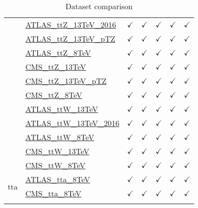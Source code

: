 \documentclass{article}
\begin{document}
\begin{longtable}{|c|l|c|c|c|c|c|}
 & \href{https://arxiv.org}{ATLAS_ttZ_13TeV_2016}  & $\checkmark$ & $\checkmark$ & $\checkmark$ & $\checkmark$ & $\checkmark$\\ \cline{2-7}
 & \href{https://arxiv.org}{ATLAS_ttZ_13TeV_pTZ}  & $\checkmark$ & $\checkmark$ & $\checkmark$ & $\checkmark$ & $\checkmark$\\ \cline{2-7}
 & \href{https://arxiv.org}{ATLAS_ttZ_8TeV}  & $\checkmark$ & $\checkmark$ & $\checkmark$ & $\checkmark$ & $\checkmark$\\ \cline{2-7}
 & \href{https://arxiv.org}{CMS_ttZ_13TeV}  & $\checkmark$ & $\checkmark$ & $\checkmark$ & $\checkmark$ & $\checkmark$\\ \cline{2-7}
 & \href{https://arxiv.org}{CMS_ttZ_13TeV_pTZ}  & $\checkmark$ & $\checkmark$ & $\checkmark$ & $\checkmark$ & $\checkmark$\\ \cline{2-7}
 & \href{https://arxiv.org}{CMS_ttZ_8TeV}  & $\checkmark$ & $\checkmark$ & $\checkmark$ & $\checkmark$ & $\checkmark$\\ \cline{2-7}
 & \href{https://arxiv.org}{ATLAS_ttW_13TeV}  & $\checkmark$ & $\checkmark$ & $\checkmark$ & $\checkmark$ & $\checkmark$\\ \cline{2-7}
 & \href{https://arxiv.org}{ATLAS_ttW_13TeV_2016}  & $\checkmark$ & $\checkmark$ & $\checkmark$ & $\checkmark$ & $\checkmark$\\ \cline{2-7}
 & \href{https://arxiv.org}{ATLAS_ttW_8TeV}  & $\checkmark$ & $\checkmark$ & $\checkmark$ & $\checkmark$ & $\checkmark$\\ \cline{2-7}
 & \href{https://arxiv.org}{CMS_ttW_13TeV}  & $\checkmark$ & $\checkmark$ & $\checkmark$ & $\checkmark$ & $\checkmark$\\ \cline{2-7}
 & \href{https://arxiv.org}{CMS_ttW_8TeV}  & $\checkmark$ & $\checkmark$ & $\checkmark$ & $\checkmark$ & $\checkmark$
\\ \hline
\multirow{2}{*}{tta}
 & \href{https://arxiv.org}{ATLAS_tta_8TeV}  & $\checkmark$ & $\checkmark$ & $\checkmark$ & $\checkmark$ & $\checkmark$\\ \cline{2-7}
 & \href{https://arxiv.org}{CMS_tta_8TeV}  & $\checkmark$ & $\checkmark$ & $\checkmark$ & $\checkmark$ & $\checkmark$
\\ \hline
\caption{Dataset comparison}
\end{longtable}
\end{document}
